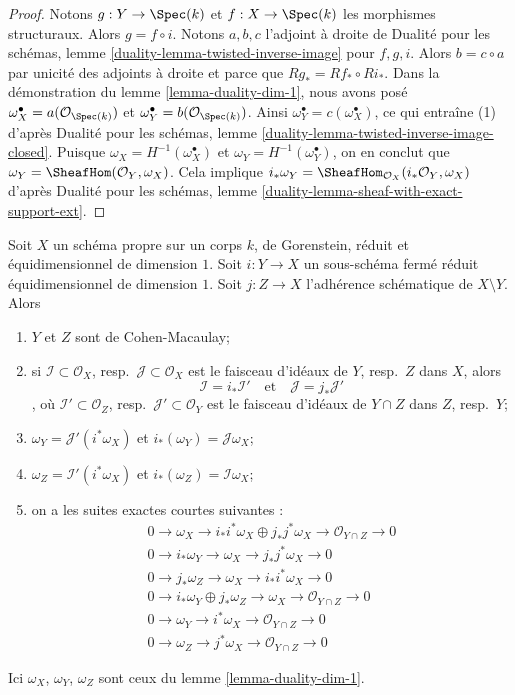 \begin{proof}
Notons $g : Y \to \Spec(k)$ et $f : X \to \Spec(k)$ les morphismes structuraux. Alors $g = f \circ i$. Notons $a, b, c$ l'adjoint à droite de Dualité pour les schémas, lemme \ref{duality-lemma-twisted-inverse-image} pour $f, g, i$. Alors $b = c \circ a$ par unicité des adjoints à droite et parce que $Rg_* = Rf_* \circ Ri_*$. Dans la démonstration du lemme \ref{lemma-duality-dim-1}, nous avons posé $\omega_X^\bullet = a(\mathcal{O}_{\Spec(k)})$ et $\omega_Y^\bullet = b(\mathcal{O}_{\Spec(k)})$. Ainsi $\omega_Y^\bullet = c(\omega_X^\bullet)$, ce qui entraîne (1) d'après Dualité pour les schémas, lemme \ref{duality-lemma-twisted-inverse-image-closed}. Puisque $\omega_X = H^{-1}(\omega_X^\bullet)$ et $\omega_Y = H^{-1}(\omega_Y^\bullet)$, on en conclut que $\omega_Y = \SheafHom(\mathcal{O}_Y, \omega_X)$. Cela implique $i_*\omega_Y = \SheafHom_{\mathcal{O}_X}(i_*\mathcal{O}_Y, \omega_X)$ d'après Dualité pour les schémas, lemme \ref{duality-lemma-sheaf-with-exact-support-ext}.
\end{proof}

\begin{lemma}
\label{lemma-closed-subscheme-reduced-gorenstein}
Soit $X$ un schéma propre sur un corps $k$, de Gorenstein, réduit et équidimensionnel de dimension $1$. Soit $i : Y \to X$ un sous-schéma fermé réduit équidimensionnel de dimension $1$. Soit $j : Z \to X$ l'adhérence schématique de $X \setminus Y$. Alors \begin{enumerate} \item $Y$ et $Z$ sont de Cohen-Macaulay; \item si $\mathcal{I} \subset \mathcal{O}_X$, resp.\ $\mathcal{J} \subset \mathcal{O}_X$ est le faisceau d'idéaux de $Y$, resp.\ $Z$ dans $X$, alors $$
\mathcal{I} = i_*\mathcal{I}'
\quad\text{et}\quad
\mathcal{J} = j_*\mathcal{J}'
$$, où $\mathcal{I}' \subset \mathcal{O}_Z$, resp.\ $\mathcal{J}' \subset \mathcal{O}_Y$ est le faisceau d'idéaux de $Y \cap Z$ dans $Z$, resp.\ $Y$; \item $\omega_Y = \mathcal{J}'(i^*\omega_X)$ et $i_*(\omega_Y) = \mathcal{J}\omega_X$; \item $\omega_Z = \mathcal{I}'(i^*\omega_X)$ et $i_*(\omega_Z) = \mathcal{I}\omega_X$; \item on a les suites exactes courtes suivantes : \begin{align*}
0 \to \omega_X \to i_*i^*\omega_X \oplus j_*j^*\omega_X \to
\mathcal{O}_{Y \cap Z} \to 0 \\
0 \to i_*\omega_Y \to \omega_X \to j_*j^*\omega_X \to 0 \\
0 \to j_*\omega_Z \to \omega_X \to i_*i^*\omega_X \to 0 \\
0 \to i_*\omega_Y \oplus j_*\omega_Z \to \omega_X \to
\mathcal{O}_{Y \cap Z} \to 0 \\
0 \to \omega_Y \to i^*\omega_X \to \mathcal{O}_{Y \cap Z} \to 0 \\
0 \to \omega_Z \to j^*\omega_X \to \mathcal{O}_{Y \cap Z} \to 0
\end{align*} \end{enumerate} Ici $\omega_X$, $\omega_Y$, $\omega_Z$ sont ceux du lemme \ref{lemma-duality-dim-1}.
\end{lemma}

